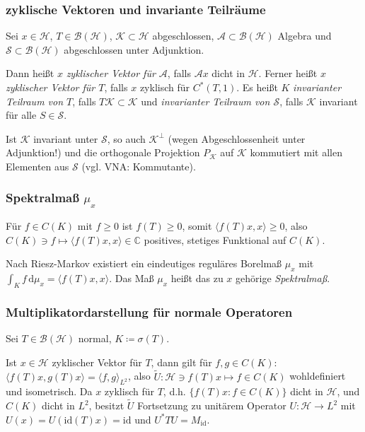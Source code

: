 \documentclass[11pt,a4paper]{scrartcl}
\newcommand{\C}{\mathbb{C}} %
\newcommand{\Hc}{\mathcal{H}}
\newcommand{\Sc}{\mathcal{S}}
\newcommand{\Kc}{\mathcal{K}}
\newcommand{\A}{\mathcal{A}}
\newcommand{\B}{\mathcal{B}}
\theoremstyle{plain}
\theoremstyle{definition}
\theoremstyle{remark}
\begin{document}
\subsubsection{zyklische Vektoren und invariante Teilräume}

Sei $x\in \Hc$, $T\in \B(\Hc)$, $\Kc \subset \Hc$ abgeschlossen, $\A \subset \B(\Hc)$ Algebra und $\Sc \subset \B(\Hc)$ abgeschlossen unter Adjunktion.

Dann heißt $x$ \emph{zyklischer Vektor für $\A$}, falls $\A x$ dicht in $\Hc$. Ferner heißt $x$ \emph{zyklischer Vektor für $T$}, falls $x$ zyklisch für $C^*(T,1)$. Es heißt $K$ \emph{invarianter Teilraum von $T$}, falls $T\Kc \subset \Kc$ und \emph{invarianter Teilraum von $\Sc$}, falls $\Kc$ invariant für alle $S\in \Sc$. 

Ist $\Kc$ invariant unter $\Sc$, so auch $\Kc^\bot$ (wegen Abgeschlossenheit unter Adjunktion!) und die orthogonale Projektion $P_\Kc$ auf $\Kc$ kommutiert mit allen Elementen aus $\Sc$ (vgl. VNA: Kommutante).

\subsubsection{Spektralmaß $\mu_x$}

Für $f\in C(K)$ mit $f \geq 0$ ist $f(T) \geq 0$, somit $\langle f(T)x, x \rangle \geq 0$, also $C(K)\ni f \mapsto \langle f(T)x,x \rangle \in \C$ positives, stetiges Funktional auf $C(K)$.

Nach Riesz-Markov existiert ein eindeutiges reguläres Borelmaß $\mu_x$ mit $\int_K f \,\mathrm{d}\mu_x = \langle f(T)x, x \rangle$. Das Maß $\mu_x$ heißt das zu $x$ gehörige \emph{Spektralmaß}.


\subsubsection{Multiplikatordarstellung für normale Operatoren}

Sei $T\in \B(\Hc)$ normal, $K\coloneqq \sigma(T)$. 

Ist $x\in \Hc$ zyklischer Vektor für $T$, dann gilt für $f,g\in C(K)$: $\langle f(T)x, g(T)x \rangle = \langle f,g\rangle_{L^2}$, also $\tilde U: \Hc\ni f(T)x \mapsto f \in C(K)$ wohldefiniert und isometrisch. Da $x$ zyklisch für $T$, d.h. $\{ f(T)x: f\in C(K) \}$ dicht in $\Hc$, und $C(K)$ dicht in $L^2$, besitzt $\tilde U$ Fortsetzung zu unitärem Operator $U: \Hc \to L^2$ mit $U(x)=U(\mathrm{id}(T)x)=\mathrm{id}$ und $U^*TU=M_\mathrm{id}$.
\end{document}
